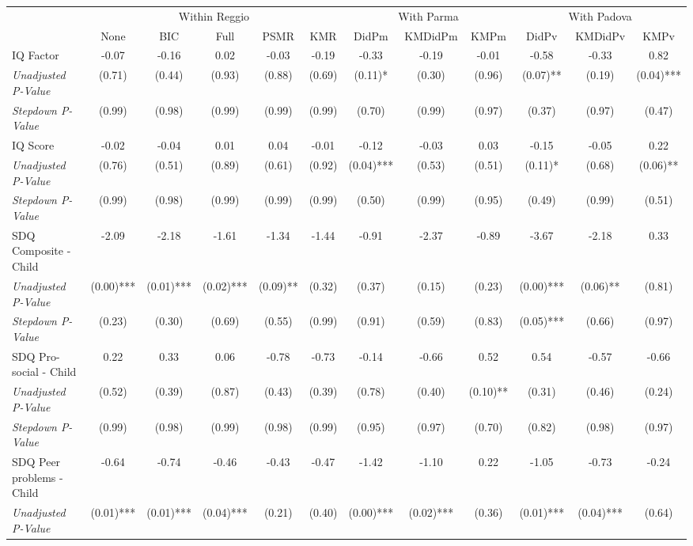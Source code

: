 \begin{tabular}{l c c c c c c c c c c c}
\toprule
& \multicolumn{5}{c}{Within Reggio} & \multicolumn{3}{c}{With Parma} & \multicolumn{3}{c}{With Padova} \\\cmidrule(lr){2-6} \cmidrule(lr){7-9} \cmidrule(lr){10-12}
 & None & BIC & Full & PSMR & KMR & DidPm & KMDidPm & KMPm & DidPv & KMDidPv & KMPv \\
\midrule
IQ Factor & -0.07 & -0.16 & 0.02 & -0.03 & -0.19 & -0.33 & -0.19 & -0.01 & -0.58 & -0.33 & 0.82 \\
\quad \textit{Unadjusted P-Value} & (0.71) & (0.44) & (0.93) & (0.88) & (0.69) & (0.11)* & (0.30) & (0.96) & (0.07)** & (0.19) & (0.04)*** \\
\quad \textit{Stepdown P-Value} & (0.99) & (0.98) & (0.99) & (0.99) & (0.99) & (0.70) & (0.99) & (0.97) & (0.37) & (0.97) & (0.47) \\
IQ Score & -0.02 & -0.04 & 0.01 & 0.04 & -0.01 & -0.12 & -0.03 & 0.03 & -0.15 & -0.05 & 0.22 \\
\quad \textit{Unadjusted P-Value} & (0.76) & (0.51) & (0.89) & (0.61) & (0.92) & (0.04)*** & (0.53) & (0.51) & (0.11)* & (0.68) & (0.06)** \\
\quad \textit{Stepdown P-Value} & (0.99) & (0.98) & (0.99) & (0.99) & (0.99) & (0.50) & (0.99) & (0.95) & (0.49) & (0.99) & (0.51) \\
SDQ Composite - Child & -2.09 & -2.18 & -1.61 & -1.34 & -1.44 & -0.91 & -2.37 & -0.89 & -3.67 & -2.18 & 0.33 \\
\quad \textit{Unadjusted P-Value} & (0.00)*** & (0.01)*** & (0.02)*** & (0.09)** & (0.32) & (0.37) & (0.15) & (0.23) & (0.00)*** & (0.06)** & (0.81) \\
\quad \textit{Stepdown P-Value} & (0.23) & (0.30) & (0.69) & (0.55) & (0.99) & (0.91) & (0.59) & (0.83) & (0.05)*** & (0.66) & (0.97) \\
SDQ Pro-social - Child & 0.22 & 0.33 & 0.06 & -0.78 & -0.73 & -0.14 & -0.66 & 0.52 & 0.54 & -0.57 & -0.66 \\
\quad \textit{Unadjusted P-Value} & (0.52) & (0.39) & (0.87) & (0.43) & (0.39) & (0.78) & (0.40) & (0.10)** & (0.31) & (0.46) & (0.24) \\
\quad \textit{Stepdown P-Value} & (0.99) & (0.98) & (0.99) & (0.98) & (0.99) & (0.95) & (0.97) & (0.70) & (0.82) & (0.98) & (0.97) \\
SDQ Peer problems - Child & -0.64 & -0.74 & -0.46 & -0.43 & -0.47 & -1.42 & -1.10 & 0.22 & -1.05 & -0.73 & -0.24 \\
\quad \textit{Unadjusted P-Value} & (0.01)*** & (0.01)*** & (0.04)*** & (0.21) & (0.40) & (0.00)*** & (0.02)*** & (0.36) & (0.01)*** & (0.04)*** & (0.64) \\

\end{tabular}
